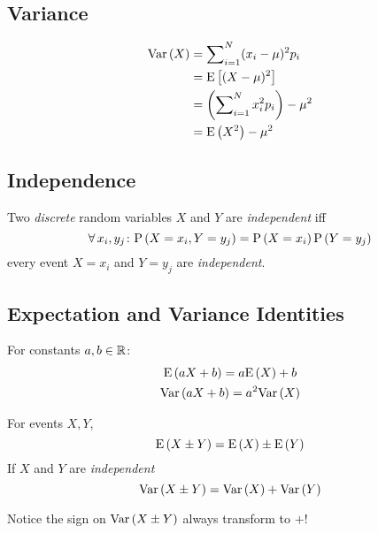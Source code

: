 \subsection*{Variance}

\begin{align*}
    \mathrm{Var} \left( X \right)
    &= \sum \nolimits_{i = 1}^{N} (x_i - \mu)^2 p_i \\
    &= \mathrm{E} \left[ (X - \mu)^2 \right] \\
    &= \left( \sum \nolimits_{i = 1}^{N} x_i^2 p_i \right) - \mu^2 \\
    &= \mathrm{E} \left( X^2 \right) - \mu^2
\end{align*}

\subsection*{Independence}

Two \textit{discrete} random variables $X$ and $Y$ are \textit{independent} iff
\begin{equation*}
    \operatorname{\forall} x_i, y_j \colon \mathrm{P} \left( X = x_i, Y = y_j \right) = \mathrm{P} \left( X = x_i \right)\mathrm{P} \left( Y = y_j \right)
\end{equation*}
every event $X = x_i$ and $Y = y_j$ are \textit{independent}.

\subsection*{Expectation and Variance Identities}

For constants $a, b \in \mathbb{R}$:
\begin{gather*}
    \mathrm{E} \left( a X + b \right) = a \mathrm{E} \left( X \right) + b \\
    \mathrm{Var} \left( a X + b \right) = a^2 \mathrm{Var} \left( X \right)
\end{gather*}

For events $X, Y$,
\begin{equation*}
    \mathrm{E} \left( X \pm Y \right) = \mathrm{E} \left( X \right) \pm \mathrm{E} \left( Y \right)
\end{equation*}
If $X$ and $Y$ are \textit{independent}
\begin{equation*}
    \mathrm{Var} \left( X \pm Y \right) = \mathrm{Var} \left( X \right) + \mathrm{Var} \left( Y \right)
\end{equation*}

\begin{remark}
    Notice the sign on $\mathrm{Var} \left( X \pm Y \right)$ always transform to $+$!
\end{remark}
